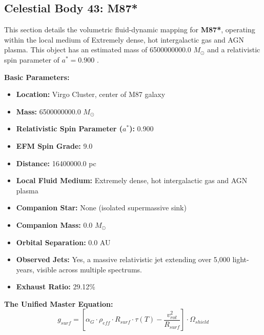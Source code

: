 \documentclass[11pt, a4paper]{article}
\begin{document}
\clearpage
\subsection{Celestial Body 43: M87*}
This section details the volumetric fluid-dynamic mapping for \textbf{M87*}, operating within the local medium of Extremely dense, hot intergalactic gas and AGN plasma. This object has an estimated mass of 6500000000.0 $M_{\odot}$ and a relativistic spin parameter of $a^* = 0.900$ \cite{eventhorizontelescopecollaboration2019, ned}.

\vspace{0.5em}
\noindent \textbf{Basic Parameters:}
\begin{itemize}
  \item \textbf{Location:} Virgo Cluster, center of M87 galaxy
  \item \textbf{Mass:} 6500000000.0 $M_{\odot}$
  \item \textbf{Relativistic Spin Parameter ($a^*$):} 0.900
  \item \textbf{EFM Spin Grade:} 9.0
  \item \textbf{Distance:} 16400000.0 pc
  \item \textbf{Local Fluid Medium:} Extremely dense, hot intergalactic gas and AGN plasma
  \item \textbf{Companion Star:} None (isolated supermassive sink)
  \item \textbf{Companion Mass:} 0.0 $M_{\odot}$
  \item \textbf{Orbital Separation:} 0.0 AU
  \item \textbf{Observed Jets:} Yes, a massive relativistic jet extending over 5,000 light-years, visible across multiple spectrums.
  \item \textbf{Exhaust Ratio:} 29.12\%
\end{itemize}

\vspace{0.5em}
\noindent \textbf{The Unified Master Equation:}
$$ g_{surf} = \left[ \alpha_G \cdot \rho_{eff} \cdot R_{surf} \cdot \tau(T) - \frac{v_{rot}^2}{R_{surf}} \right] \cdot \Omega_{shield} $$
\end{document}
